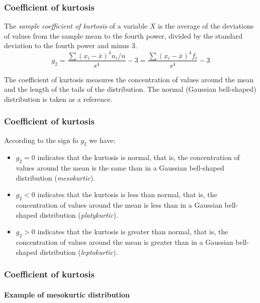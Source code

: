 \begin{frame}
\frametitle{Coefficient of kurtosis}
\begin{definition}
The \emph{sample coefficient of kurtosis} of a variable $X$ is the average of the deviations of values from the sample
mean to the fourth power, divided by the standard deviation to the fourth power and minus 3. 
\[g_2 = \frac{\sum (x_i-\bar x)^4 n_i/n}{s^4}-3 = \frac{\sum (x_i-\bar x)^4 f_i}{s^4}-3\]
\end{definition}

The coefficient of kurtosis measures the concentration of values around the mean and the length of the tails of the distribution. 
The normal (Gaussian bell-shaped) distribution is taken as a reference.
\end{frame}


\begin{frame}
\frametitle{Coefficient of kurtosis}
According to the sign fo $g_2$ we have:

\begin{itemize}
\item $g_2=0$ indicates that the kurtosis is normal, that is, the concentration of values around the mean is the same than in a Gaussian bell-shaped distribution (\emph{mesokurtic}).
\item $g_2<0$ indicates that the kurtosis is less than normal, that is, the concentration of values around the mean is less than in a Gaussian bell-shaped distribution (\emph{platykurtic}).
\item $g_2>0$ indicates that the kurtosis is greater than normal, that is, the concentration of values around the mean is greater than in a Gaussian bell-shaped distribution (\emph{leptokurtic}).
\end{itemize}
\end{frame}
  

\begin{frame}
\frametitle{Coefficient of kurtosis}
\framesubtitle{Example of mesokurtic distribution}
\begin{center}
\scalebox{0.6}{}
\end{center}
\end{frame}


